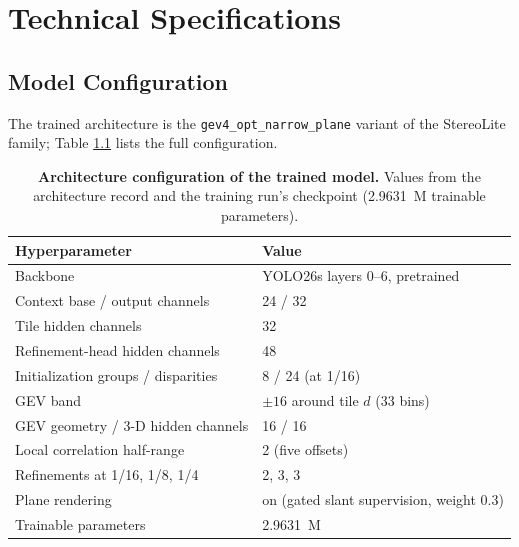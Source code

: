 \chapter{Technical Specifications}

\section{Model Configuration}
The trained architecture is the \texttt{gev4\_opt\_narrow\_plane}
variant of the StereoLite family; Table \ref{tab:arch_config} lists the
full configuration.

\begin{table}[!htbp]
\centering
\caption{\textbf{Architecture configuration of the trained model.} Values from the architecture record and the training run's checkpoint (2.9631~M trainable parameters).}
\label{tab:arch_config}
\small
\begin{tabular}{ll}
\toprule
Hyperparameter & Value\\
\midrule
Backbone & YOLO26s layers 0--6, pretrained\\
Context base / output channels & 24 / 32\\
Tile hidden channels & 32\\
Refinement-head hidden channels & 48\\
Initialization groups / disparities & 8 / 24 (at 1/16)\\
GEV band & $\pm 16$ around tile $d$ (33 bins)\\
GEV geometry / 3-D hidden channels & 16 / 16\\
Local correlation half-range & 2 (five offsets)\\
Refinements at 1/16, 1/8, 1/4 & 2, 3, 3\\
Plane rendering & on (gated slant supervision, weight 0.3)\\
Trainable parameters & 2.9631~M\\
\bottomrule
\end{tabular}
\end{table}

